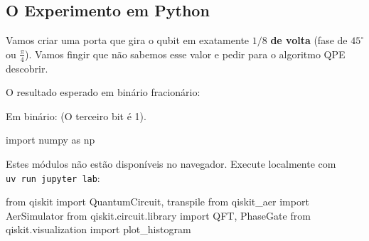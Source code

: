 \documentclass[
  brazilian,
]{report}
\newenvironment{Shaded}{\begin{snugshade}}{\end{snugshade}}
\newcommand{\ImportTok}[1]{\textcolor[rgb]{0.00,0.46,0.62}{#1}}
\newcommand{\NormalTok}[1]{\textcolor[rgb]{0.00,0.23,0.31}{#1}}
\begin{document}
\subsection{O Experimento em Python}\label{o-experimento-em-python}

Vamos criar uma porta que gira o qubit em exatamente \(1/8\) \textbf{de
volta} (fase de \(45^\circ\) ou \(\frac{\pi}{4}\)). Vamos fingir que não
sabemos esse valor e pedir para o algoritmo QPE descobrir.

O resultado esperado em binário fracionário:

Em binário: (O terceiro bit é 1).

\begin{Shaded}
\begin{Highlighting}[]
\NormalTok{import numpy as np}
\end{Highlighting}
\end{Shaded}

\begin{tcolorbox}[enhanced jigsaw, arc=.35mm, bottomrule=.15mm, bottomtitle=1mm, breakable, colback=white, colbacktitle=quarto-callout-note-color!10!white, colframe=quarto-callout-note-color-frame, coltitle=black, left=2mm, leftrule=.75mm, opacityback=0, opacitybacktitle=0.6, rightrule=.15mm, title=\textcolor{quarto-callout-note-color}{\faInfo}\hspace{0.5em}{🔒 Imports do Qiskit (requerem execução local)}, titlerule=0mm, toprule=.15mm, toptitle=1mm]

Estes módulos não estão disponíveis no navegador. Execute localmente com
\texttt{uv\ run\ jupyter\ lab}:

\begin{Shaded}
\begin{Highlighting}[]
\ImportTok{from}\NormalTok{ qiskit }\ImportTok{import}\NormalTok{ QuantumCircuit, transpile}
\ImportTok{from}\NormalTok{ qiskit\_aer }\ImportTok{import}\NormalTok{ AerSimulator}
\ImportTok{from}\NormalTok{ qiskit.circuit.library }\ImportTok{import}\NormalTok{ QFT, PhaseGate}
\ImportTok{from}\NormalTok{ qiskit.visualization }\ImportTok{import}\NormalTok{ plot\_histogram}
\end{Highlighting}
\end{Shaded}

\end{tcolorbox}
\end{document}

